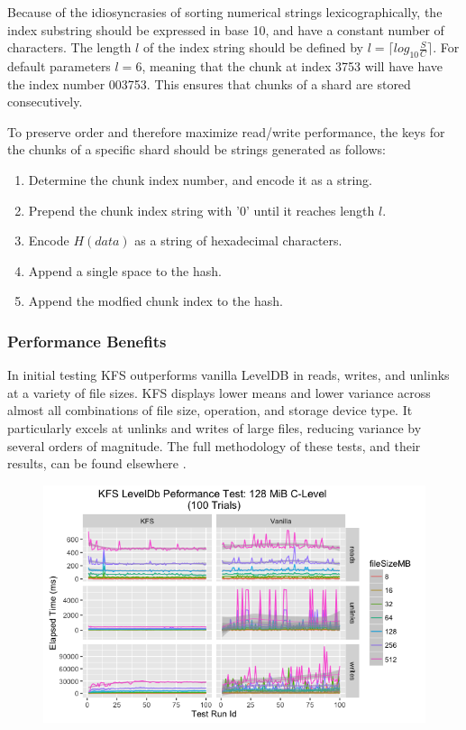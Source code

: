 \documentclass[a4paper,10pt]{article}
\begin{document}
Because of the idiosyncrasies of sorting numerical strings lexicographically, the index substring should be expressed in base 10, and have a constant number of characters. The length $ l $ of the index string should be defined by $ l = \lceil log_{10} \frac{S}{C} \rceil $. For default parameters $ l = 6 $, meaning that the chunk at index 3753 will have have the index number 003753. This ensures that chunks of a shard are stored consecutively.

To preserve order and therefore maximize read/write performance, the keys for the chunks of a specific shard should be strings generated as follows:

\begin{enumerate}
\item Determine the chunk index number, and encode it as a string.
\item Prepend the chunk index string with '0' until it reaches length $ l $.
\item Encode $ H(data) $ as a string of hexadecimal characters.
\item Append a single space to the hash.
\item Append the modfied chunk index to the hash.
\end{enumerate}

\subsubsection{Performance Benefits}
In initial testing KFS outperforms vanilla LevelDB in reads, writes, and unlinks at a variety of file sizes. KFS displays lower means and lower variance across almost all combinations of file size, operation, and storage device type. It particularly excels at unlinks and writes of large files, reducing variance by several orders of magnitude. The full methodology of these tests, and their results, can be found elsewhere \cite{13}.

\begin{figure}[hbt]
\centering
\includegraphics[width=\linewidth]{6}
\end{figure}
\end{document}
